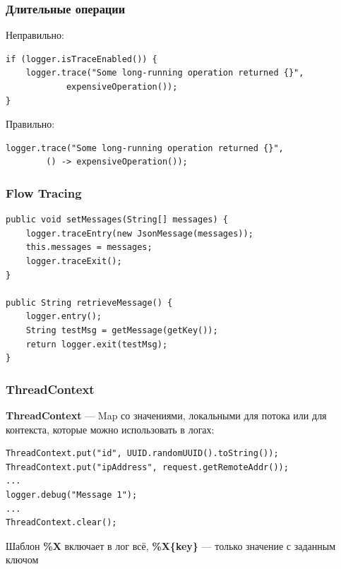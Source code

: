 \documentclass[xetex,mathserif,serif]{beamer}
\begin{document}
	\begin{frame}[fragile]
		\frametitle{Длительные операции}
		Неправильно:
		\begin{verbatim}
if (logger.isTraceEnabled()) {
    logger.trace("Some long-running operation returned {}", 
            expensiveOperation());
}
		\end{verbatim}

		Правильно:
		\begin{verbatim}
logger.trace("Some long-running operation returned {}", 
        () -> expensiveOperation());
		\end{verbatim}
\end{frame}

	\begin{frame}[fragile]
		\frametitle{Flow Tracing}
		\begin{verbatim}
public void setMessages(String[] messages) {
    logger.traceEntry(new JsonMessage(messages));
    this.messages = messages;
    logger.traceExit();
}

public String retrieveMessage() {
    logger.entry();
    String testMsg = getMessage(getKey());
    return logger.exit(testMsg);
}
		\end{verbatim}
\end{frame}

	\begin{frame}[fragile]
		\frametitle{ThreadContext}
		\textbf{ThreadContext} --- Map со значениями, локальными для потока или для контекста, которые можно использовать в логах:
		\begin{verbatim}
ThreadContext.put("id", UUID.randomUUID().toString());
ThreadContext.put("ipAddress", request.getRemoteAddr());
...
logger.debug("Message 1");
...
ThreadContext.clear();
		\end{verbatim}
		Шаблон \textbf{\%X} включает в лог всё, \textbf{\%X\{key\}} --- только значение с заданным ключом
\end{frame}
\end{document}
